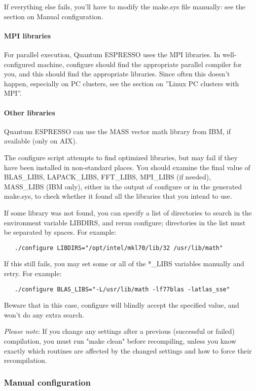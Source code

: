 \documentclass[12pt,a4paper]{article}
\begin{document}
If everything else fails, you'll have to modify the make.sys file
manually: see the section on Manual configuration. 

\paragraph{MPI libraries} 
For parallel execution, Quantum ESPRESSO uses the MPI libraries.
In well-configured machine, configure should find the appropriate
parallel compiler for you, and this should find the appropriate
libraries. Since often this doesn't 
happen, especially on PC clusters, see the section on 
''Linux PC clusters with MPI''.

\paragraph{Other libraries}
Quantum ESPRESSO can use the MASS vector math
library from IBM, if available (only on AIX).
    
The configure script attempts to find optimized libraries, but may fail
if they have been installed in non-standard places. You should examine
the ﬁnal value of BLAS\_LIBS, LAPACK\_LIBS, FFT\_LIBS, MPI\_LIBS (if needed),
MASS\_LIBS (IBM only), either in the output of configure or in the generated
make.sys, to check whether it found all the libraries that you intend to use.
    
If some library was not found, you can specify a list of directories to search
in the environment variable LIBDIRS, and rerun configure; directories in the
list must be separated by spaces. For example:
\begin{verbatim}
   ./configure LIBDIRS="/opt/intel/mkl70/lib/32 /usr/lib/math"
\end{verbatim}
If this still fails, you may set some or all of the *\_LIBS variables manually
and retry. For example:
\begin{verbatim}
   ./configure BLAS_LIBS="-L/usr/lib/math -lf77blas -latlas_sse"
\end{verbatim}
Beware that in this case, configure will blindly accept the specified value,
and won't do any extra search. 
    
{\em Please note}: If you change any settings after a previous (successful or
failed) compilation, you must run "make clean" before recompiling, unless you
know exactly which routines are aﬀected by the changed settings and how to
force their recompilation.

\subsubsection{Manual configuration}
\end{document}
